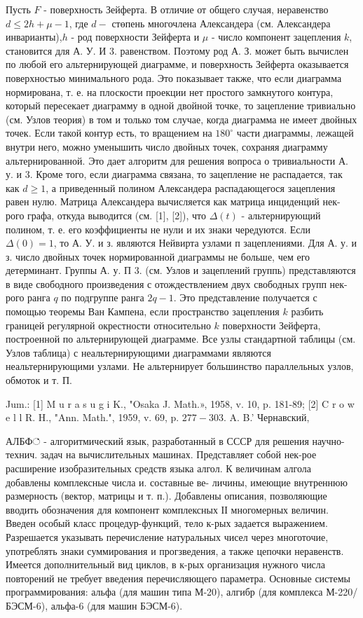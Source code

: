 \documentclass[10pt]{article}
\begin{document}
Пусть $F$ - поверхность Зейферта. В отличие от общего случая, неравенство $d \leqslant 2 h+\mu-1$, где $d-$ стөпень многочлена Александера (см. Александера инварианты),$h$ - род поверхности Зейферта и $\mu$ - число компонент зацепления $k$, становится для А. У. И 3. равенством. Поэтому род А. З. может быть вычислен по любой его альтернирующей диаграмме, и поверхность Зейферта оказывается поверхностью минимального рода. Это показывает также, что если диаграмма нормирована, т. е. на плоскости проекции нет простого замкнутого контура, который пересекает диаграмму в одной двойной точке, то зацепление тривиально (см. Узлов теория) в том и только том случае, когда диаграмма не имеет двойных точек. Если такой контур есть, то вращением на $180^{\circ}$ части диаграммы, лежащей внутри него, можно уменышить число двойных точек, сохраняя диаграмму альтернированной. Это дает алгоритм для решения вопроса о тривиальности А. у. и 3. Кроме того, если диаграмма связана, то зацепление не распадается, так как $d \geqslant 1$, а приведенный полином Александера распадающегося зацепления равен нулю. Матрица Александера вычисляется как матрица инциденций нек-рого графа, откуда выводится (см. [1], [2]), что $\Delta(t)$ - альтернирующий полином, т. е. его коэффициенты не нули и их знаки чередуются. Если $\Delta(0)=1$, то А. У. и з. являются Нейвирта узлами п зацеплениями. Для А. у. и з. число двойных точек нормированной диаграммы не больше, чем его детерминант. Группы А. у. П 3. (см. Узлов и зацеплений группь) представляются в виде свободного произведения с отождествлением двух свободных групп нек-рого ранга $q$ по подгруппе ранга $2 q-1$. Это представление получается с помощью теоремы Ван Кампена, если пространство зацепления $k$ разбить границей регулярной окрестности относительно $k$ поверхности Зейферта, построенной по альтернирующей диаграмме. Все узлы стандартной таблицы (см. Узлов таблица) с неальтернирующими диаграммами являются неальтернирующими узлами. Не альтернирует большинство параллельных узлов, обмоток и т. П.



Jum.: [1] M u r a s u g i K., "Osaka J. Math.», 1958, v. 10, p. 181-89; [2] C r o w e l l R. H., "Ann. Math.", 1959, v. 69, p. $277-303$. A. B.' Чернавский,



АЛБФ் - алгоритмический язык, разработанный в СССР для решения научно-технич. задач на вычислительных машинах. Представляет собой нек-рое расширение изобразительных средств языка алгол. К величинам алгола добавлены комплексные числа и. составные ве- личины, имеющие внутреннюю размерность (вектор, матрицы и т. п.). Добавлены описания, позволяющие вводить обозначения для компонент комплексных ІІ многомерных величин. Введен особый класс процедур-функций, тело к-рых задается выражением. Разрешается указывать перечисление натуральных чисел через многоточие, употреблять знаки суммирования и прогзведения, а также цепочки неравенств. Имеется дополнительный вид циклов, в к-рых организация нужного числа повторений не требует введения перечисляющего параметра. Основные системы программирования: альфа (для машин типа М-20), алгибр (для комплекса М-220/БЭСМ-6), альфа-6 (для машин БЭСМ-6).
\end{document}

